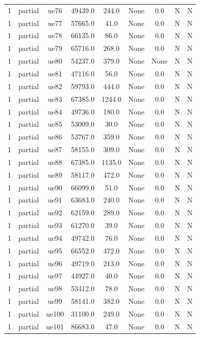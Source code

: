 \begin{table}[ht]
\begin{tabular}{|c|c|c|c|c|c|c|c|c|}
1 & partial & ue76 & 49439.0 & 244.0 & None & 0.0 & N & N \\
1 & partial & ue77 & 57665.0 & 41.0 & None & 0.0 & N & N \\
1 & partial & ue78 & 66135.0 & 86.0 & None & 0.0 & N & N \\
1 & partial & ue79 & 65716.0 & 268.0 & None & 0.0 & N & N \\
1 & partial & ue80 & 54237.0 & 379.0 & None & None & N & N \\
1 & partial & ue81 & 47116.0 & 56.0 & None & 0.0 & N & N \\
1 & partial & ue82 & 59793.0 & 444.0 & None & 0.0 & N & N \\
1 & partial & ue83 & 67385.0 & 1244.0 & None & 0.0 & N & N \\
1 & partial & ue84 & 49736.0 & 180.0 & None & 0.0 & N & N \\
1 & partial & ue85 & 53009.0 & 30.0 & None & 0.0 & N & N \\
1 & partial & ue86 & 53767.0 & 359.0 & None & 0.0 & N & N \\
1 & partial & ue87 & 58155.0 & 309.0 & None & 0.0 & N & N \\
1 & partial & ue88 & 67385.0 & 1135.0 & None & 0.0 & N & N \\
1 & partial & ue89 & 58117.0 & 472.0 & None & 0.0 & N & N \\
1 & partial & ue90 & 66099.0 & 51.0 & None & 0.0 & N & N \\
1 & partial & ue91 & 63683.0 & 240.0 & None & 0.0 & N & N \\
1 & partial & ue92 & 62159.0 & 289.0 & None & 0.0 & N & N \\
1 & partial & ue93 & 61270.0 & 39.0 & None & 0.0 & N & N \\
1 & partial & ue94 & 49742.0 & 76.0 & None & 0.0 & N & N \\
1 & partial & ue95 & 66552.0 & 472.0 & None & 0.0 & N & N \\
1 & partial & ue96 & 49719.0 & 213.0 & None & 0.0 & N & N \\
1 & partial & ue97 & 44927.0 & 40.0 & None & 0.0 & N & N \\
1 & partial & ue98 & 53412.0 & 78.0 & None & 0.0 & N & N \\
1 & partial & ue99 & 58141.0 & 382.0 & None & 0.0 & N & N \\
1 & partial & ue100 & 31100.0 & 249.0 & None & 0.0 & N & N \\
1 & partial & ue101 & 86683.0 & 47.0 & None & 0.0 & N & N \\

\end{tabular}
\end{table}
